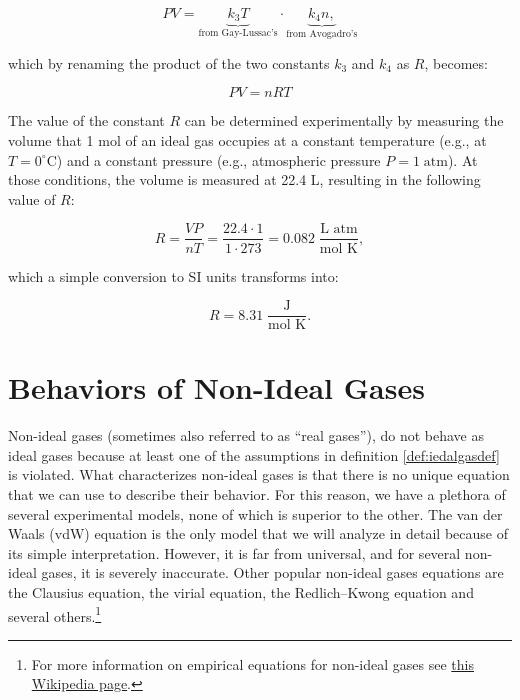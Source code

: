 \documentclass[
  9pt,
]{extbook}
\theoremstyle{definition}
\theoremstyle{definition}
\theoremstyle{definition}
\theoremstyle{remark}
\begin{document}
\begin{equation}
PV=\underbrace{k_3 T}_{\text{from Gay-Lussac's}} \cdot \underbrace{k_4 n,}_{\text{from Avogadro's}}
\label{eq:ideallaw1}
\end{equation}

which by renaming the product of the two constants \(k_3\) and \(k_4\) as \(R\), becomes:

\begin{equation}
PV=nRT
\label{eq:ideallaw2}
\end{equation}

The value of the constant \(R\) can be determined experimentally by measuring the volume that 1 mol of an ideal gas occupies at a constant temperature (e.g., at \(T=0^\circ\mathrm{C}\)) and a constant pressure (e.g., atmospheric pressure \(P=1\;\mathrm{atm}\)). At those conditions, the volume is measured at 22.4 L, resulting in the following value of \(R\):

\begin{equation}
R=\frac{VP}{nT}=\frac{22.4 \cdot 1}{1 \cdot 273}=0.082 \;\frac{\text{L atm}}{\text{mol K}},
\label{eq:ideallaw3}
\end{equation}

which a simple conversion to SI units transforms into:

\begin{equation}
R=8.31\;\frac{\text{J}}{\text{mol K}}.
\label{eq:RvalueSI}
\end{equation}

\hypertarget{behaviors-of-non-ideal-gases}{%
\section{Behaviors of Non-Ideal Gases}\label{behaviors-of-non-ideal-gases}}

Non-ideal gases (sometimes also referred to as ``real gases''), do not behave as ideal gases because at least one of the assumptions in definition \ref{def:iedalgasdef} is violated. What characterizes non-ideal gases is that there is no unique equation that we can use to describe their behavior. For this reason, we have a plethora of several experimental models, none of which is superior to the other. The van der Waals (vdW) equation is the only model that we will analyze in detail because of its simple interpretation. However, it is far from universal, and for several non-ideal gases, it is severely inaccurate. Other popular non-ideal gases equations are the Clausius equation, the virial equation, the Redlich--Kwong equation and several others.\footnote{For more information on empirical equations for non-ideal gases see \href{https://en.wikipedia.org/wiki/Real_gas}{this Wikipedia page}.}
\end{document}
